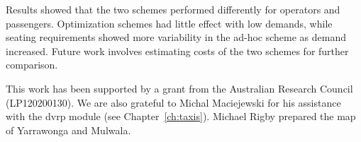 Results showed that the two schemes performed differently for operators and
passengers. Optimization schemes had little effect with low demands, while
seating requirements showed more variability in the ad-hoc scheme as demand
increased. Future work involves estimating costs of the two schemes for further
comparison.

This work has been supported by a grant from the Australian Research Council (LP120200130). We are also grateful to Michal Maciejewski for his assistance with the dvrp module (see Chapter~\ref{ch:taxis}). Michael Rigby prepared the map of Yarrawonga and Mulwala.
